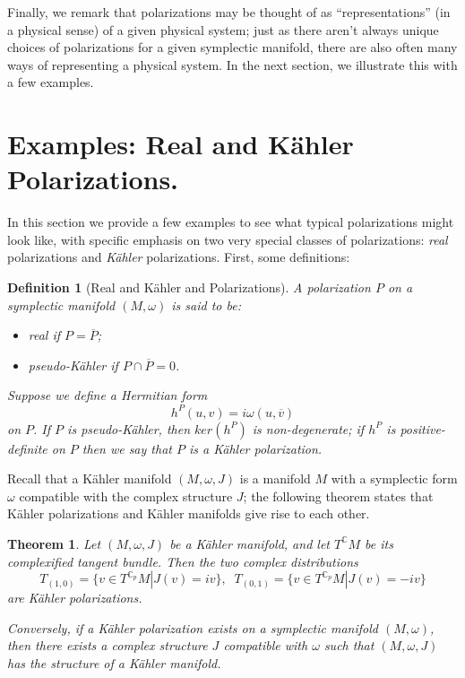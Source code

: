 \documentclass{tufte-handout}
\newtheorem{thrm}{Theorem}
\newtheorem{defn}{Definition}
\begin{document}
Finally, we remark that polarizations may be thought of as ``representations'' (in a physical sense) of a given physical system; just as there aren't always unique choices of polarizations for a given symplectic manifold, there are also often many ways of representing a physical system. In the next section, we illustrate this with a few examples.

\section{Examples: Real and K\"{a}hler Polarizations.}
In this section we provide a few examples to see what typical polarizations might look like, with specific emphasis on two very special classes of polarizations: \textit{real} polarizations and \textit{K\"{a}hler} polarizations. First, some definitions:
\begin{fullwidth}
\begin{defn}[Real and K\"{a}hler and Polarizations]
A polarization $P$ on a symplectic manifold $(M,\omega)$ is said to be:
\begin{itemize}
\item \emph{real} if $P = \overline{P}$;
\item \emph{pseudo-K\"{a}hler} if $P \cap \overline{P} = 0$.
\end{itemize}
Suppose we define a Hermitian form
$$
h^P(u,v) = i\omega(u,\overline{v})
$$
on $P$. If $P$ is pseudo-K\"{a}hler, then $ker(h^P)$ is non-degenerate; if $h^P$ is positive-definite on $P$ then we say that $P$ is a K\"{a}hler polarization.
\end{defn}
\end{fullwidth}
Recall that a K\"{a}hler manifold $(M,\omega,J)$ is a manifold $M$ with a symplectic form $\omega$ compatible with the complex structure $J$; the following theorem states that K\"{a}hler polarizations and K\"{a}hler manifolds give rise to each other.
\begin{fullwidth}
\begin{thrm}
Let $(M,\omega,J)$ be a K\"{a}hler manifold, and let $T^{\mathbb{C}}M$ be its complexified tangent bundle. Then the two complex distributions
$$
T_{(1,0)} = \{ v \in T^{\mathbb{C}_p} M | J(v) = iv \},\;\; T_{(0,1)} = \{ v \in T^{\mathbb{C}_p} M | J(v) = -iv \}
$$
are K\"{a}hler polarizations.

Conversely, if a K\"{a}hler polarization exists on a symplectic manifold $(M,\omega)$, then there exists a complex structure $J$ compatible with $\omega$ such that $(M,\omega,J)$ has the structure of a K\"{a}hler manifold.
\end{thrm}
\end{fullwidth}
\end{document}
